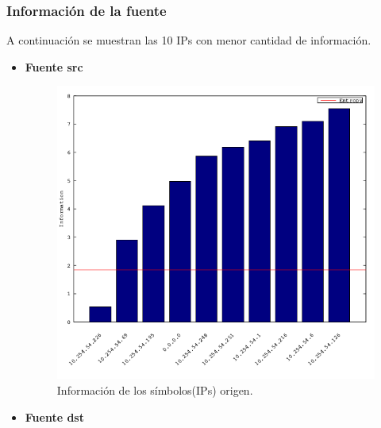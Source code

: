 \documentclass[10pt, a4paper]{article}
\begin{document}
\newpage
\subsubsection{Información de la fuente}

A continuación se muestran las 10 IPs con menor cantidad de información.

\begin{itemize}
\item \textbf{Fuente src}

\begin{figure}[H] %
\begin{center}
\includegraphics[width=400pt]{../imgs/starbucks_src_chartbar.png}
\caption{Información de los símbolos(IPs) origen.}
\end{center}
\end{figure}


\newpage
\item \textbf{Fuente dst}


\end{itemize}
\end{document}
